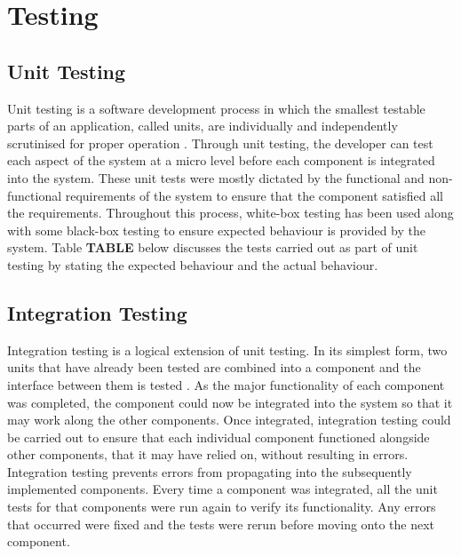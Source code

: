 \chapter{Testing}
\label{Chapter:Testing}

\section{Unit Testing}
Unit testing is a software development process in which the smallest testable parts of an application, called units, are individually and independently scrutinised for proper operation \cite{TechTarget:UnitTesting}. Through unit testing, the developer can test each aspect of the system at a micro level before each component is integrated into the system. These unit tests were mostly dictated by the functional and non-functional requirements of the system to ensure that the component satisfied all the requirements. Throughout this process, white-box testing has been used along with some black-box testing to ensure expected behaviour is provided by the system. Table \textbf{TABLE} below discusses the tests carried out as part of unit testing by stating the expected behaviour and the actual behaviour.

\section{Integration Testing}
Integration testing is a logical extension of unit testing. In its simplest form, two units that have already been tested are combined into a component and the interface between them is tested \cite{MSDN:IntegrationTesting}. As the major functionality of each component was completed, the component could now be integrated into the system so that it may work along the other components. Once integrated, integration testing could be carried out to ensure that each individual component functioned alongside other components, that it may have relied on, without resulting in errors. Integration testing prevents errors from propagating into the subsequently implemented components. Every time a component was integrated, all the unit tests for that components were run again to verify its functionality. Any errors that occurred were fixed and the tests were rerun before moving onto the next component.

